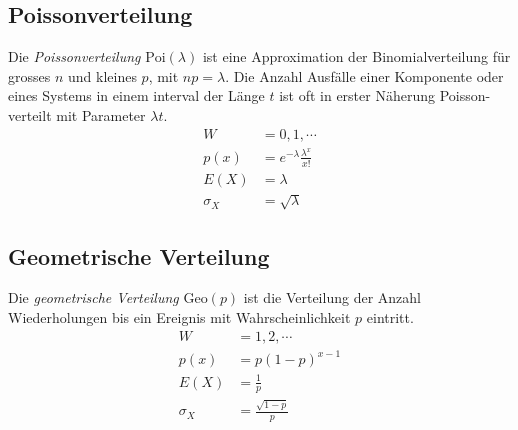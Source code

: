 \subsection{Poissonverteilung}
Die \emph{Poissonverteilung} $\mathrm{Poi}(\lambda)$ ist eine Approximation der Binomialverteilung für grosses $n$ und kleines $p$, mit $np = \lambda$. Die Anzahl Ausfälle einer Komponente oder eines Systems in einem interval der Länge $t$ ist oft in erster Näherung Poisson-verteilt mit Parameter $\lambda t$.
\begin{align*}
	W &= {0,1,\cdots}\\
	p(x) &= e^{-\lambda} \frac{\lambda^x}{x!}\\
	E(X) &= \lambda\\
	\sigma_X &= \sqrt{\lambda}
\end{align*}
\subsection{Geometrische Verteilung}
Die \emph{geometrische Verteilung} $\mathrm{Geo}(p)$ ist die Verteilung der Anzahl Wiederholungen bis ein Ereignis mit Wahrscheinlichkeit $p$ eintritt.
\begin{align*}
	W &= {1,2,\cdots}\\
	p(x) &= p(1-p)^{x-1}\\
	E(X) &= \frac{1}{p}\\
	\sigma_X &= \frac{\sqrt{1-p}}{p}
\end{align*}

